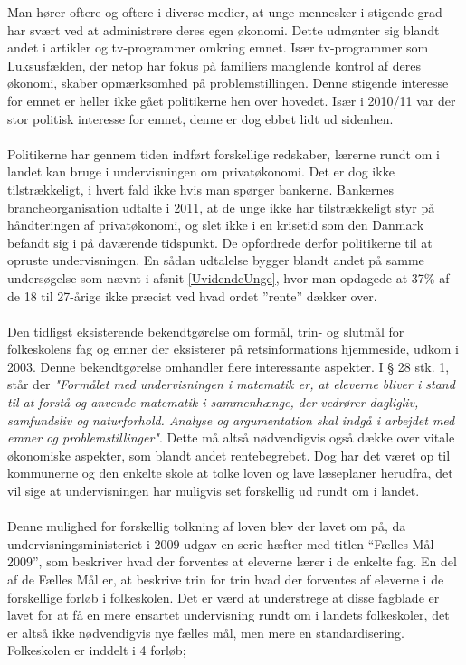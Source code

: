 \label{okonomipaaskemaet}

Man hører oftere og oftere i diverse medier, at unge mennesker i stigende grad har svært ved at administrere deres egen økonomi. Dette udmønter sig blandt andet i artikler og tv-programmer omkring emnet. Især tv-programmer som Luksusfælden, der netop har fokus på familiers manglende kontrol af deres økonomi, skaber opmærksomhed på problemstillingen. Denne stigende interesse for emnet er heller ikke gået politikerne hen over hovedet. Især i 2010/11 var der stor politisk interesse for emnet, denne er dog ebbet lidt ud sidenhen.\\
\\
Politikerne har gennem tiden indført forskellige redskaber, lærerne rundt om i landet kan bruge i undervisningen om privatøkonomi. Det er dog ikke tilstrækkeligt, i hvert fald ikke hvis man spørger bankerne. Bankernes brancheorganisation udtalte i 2011, at de unge ikke har tilstrækkeligt styr på håndteringen af privatøkonomi, og slet ikke i en krisetid som den Danmark befandt sig i på daværende tidspunkt. De opfordrede derfor politikerne til at opruste undervisningen. En sådan udtalelse bygger blandt andet på samme undersøgelse som nævnt i afsnit \ref{UvidendeUnge}, hvor man opdagede at 37\% af de 18 til 27-årige ikke præcist ved hvad ordet ”rente” dækker over.\\ %
\\
Den tidligst eksisterende bekendtgørelse om formål, trin- og slutmål for folkeskolens fag og emner der eksisterer på retsinformations hjemmeside, udkom i 2003. Denne bekendtgørelse omhandler flere interessante aspekter. I § 28 stk. 1, står der \textit{"Formålet med undervisningen i matematik er, at eleverne bliver i stand til at forstå og anvende matematik i sammenhænge, der vedrører dagligliv, samfundsliv og naturforhold. Analyse og argumentation skal indgå i arbejdet med emner og problemstillinger"}. Dette må altså nødvendigvis også dække over vitale økonomiske aspekter, som blandt andet rentebegrebet. Dog har det været op til kommunerne og den enkelte skole at tolke loven og lave læseplaner herudfra, det vil sige at undervisningen har muligvis set forskellig ud rundt om i landet.\cite{Bekendtgorelse}\\
\\
Denne mulighed for forskellig tolkning af loven blev der lavet om på, da undervisningsministeriet i 2009 udgav en serie hæfter med titlen “Fælles Mål 2009”, som beskriver hvad der forventes at eleverne lærer i de enkelte fag. En del af de Fælles Mål er, at beskrive trin for trin hvad der forventes af eleverne i de forskellige forløb i folkeskolen. Det er værd at understrege at disse fagblade er lavet for at få en mere ensartet undervisning rundt om i landets folkeskoler, det er altså ikke nødvendigvis nye fælles mål, men mere en standardisering. 
Folkeskolen er inddelt i 4 forløb;

